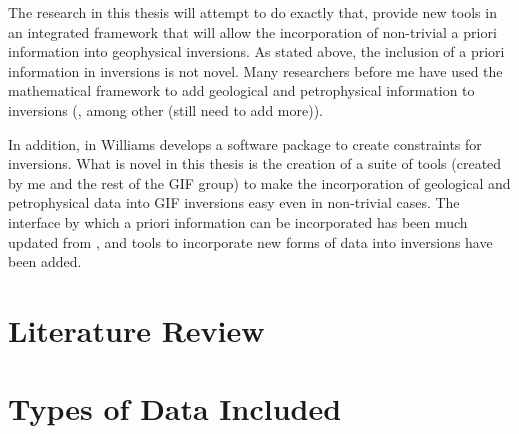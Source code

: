 The research in this thesis will attempt to do exactly that, provide new tools in an integrated framework that will allow the incorporation of non-trivial a priori information into geophysical inversions. As stated above, the inclusion of a priori information in inversions is not novel.  Many researchers before me have used the mathematical framework to add geological and petrophysical information to inversions (\citep{Lelievre2009Integrating},\citep{phillips2002geophysical} among other (still need to add more)). 

In addition, in \citep{williams2008geologically} Williams develops a software package to create constraints for inversions. What is novel in this thesis is the creation of a suite of tools (created by me and the rest of the \ac{GIF} group) to make the incorporation of geological and petrophysical data into \ac{GIF} inversions easy even in non-trivial cases. The interface by which a priori information can be incorporated has been much updated from \citep{williams2008geologically}, and tools to incorporate new forms of data into inversions have been added.



\section{Literature Review}
\label{sec:Literature Review}


\section{Types of Data Included}
\label{sec:Types of Data Included}

\endinput

 Interestingly, the assumption that all magnetizations are in the same direction also assumes that all Koenigsberger ratios are equal.

Any text after an \endinput is ignored.
You could put scraps here or things in progress.
